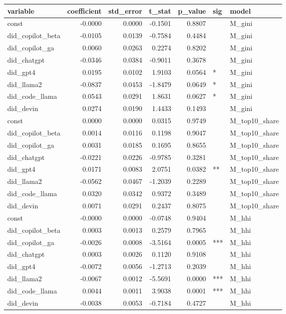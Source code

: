 \begin{tabular}{lrrrrll}
\toprule
variable & coefficient & std_error & t_stat & p_value & sig & model \\
\midrule
const & -0.0000 & 0.0000 & -0.1501 & 0.8807 &  & M_gini \\
did_copilot_beta & -0.0105 & 0.0139 & -0.7584 & 0.4484 &  & M_gini \\
did_copilot_ga & 0.0060 & 0.0263 & 0.2274 & 0.8202 &  & M_gini \\
did_chatgpt & -0.0346 & 0.0384 & -0.9011 & 0.3678 &  & M_gini \\
did_gpt4 & 0.0195 & 0.0102 & 1.9103 & 0.0564 & * & M_gini \\
did_llama2 & -0.0837 & 0.0453 & -1.8479 & 0.0649 & * & M_gini \\
did_code_llama & 0.0543 & 0.0291 & 1.8631 & 0.0627 & * & M_gini \\
did_devin & 0.0274 & 0.0190 & 1.4433 & 0.1493 &  & M_gini \\
const & 0.0000 & 0.0000 & 0.0315 & 0.9749 &  & M_top10_share \\
did_copilot_beta & 0.0014 & 0.0116 & 0.1198 & 0.9047 &  & M_top10_share \\
did_copilot_ga & 0.0031 & 0.0185 & 0.1695 & 0.8655 &  & M_top10_share \\
did_chatgpt & -0.0221 & 0.0226 & -0.9785 & 0.3281 &  & M_top10_share \\
did_gpt4 & 0.0171 & 0.0083 & 2.0751 & 0.0382 & ** & M_top10_share \\
did_llama2 & -0.0562 & 0.0467 & -1.2039 & 0.2289 &  & M_top10_share \\
did_code_llama & 0.0320 & 0.0342 & 0.9372 & 0.3489 &  & M_top10_share \\
did_devin & 0.0071 & 0.0291 & 0.2437 & 0.8075 &  & M_top10_share \\
const & -0.0000 & 0.0000 & -0.0748 & 0.9404 &  & M_hhi \\
did_copilot_beta & 0.0003 & 0.0013 & 0.2579 & 0.7965 &  & M_hhi \\
did_copilot_ga & -0.0026 & 0.0008 & -3.5164 & 0.0005 & *** & M_hhi \\
did_chatgpt & 0.0003 & 0.0026 & 0.1120 & 0.9108 &  & M_hhi \\
did_gpt4 & -0.0072 & 0.0056 & -1.2713 & 0.2039 &  & M_hhi \\
did_llama2 & -0.0067 & 0.0012 & -5.5691 & 0.0000 & *** & M_hhi \\
did_code_llama & 0.0044 & 0.0011 & 3.9038 & 0.0001 & *** & M_hhi \\
did_devin & -0.0038 & 0.0053 & -0.7184 & 0.4727 &  & M_hhi \\
\bottomrule
\end{tabular}
